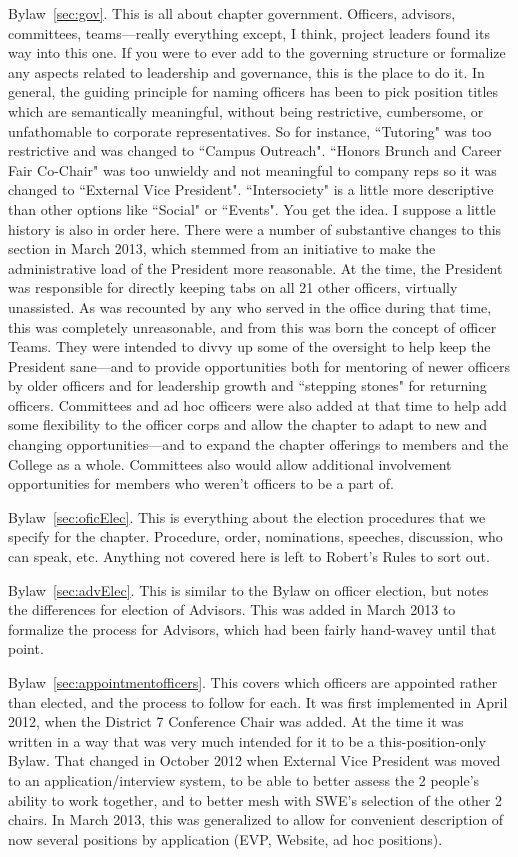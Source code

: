 \begin{preface}
Bylaw~\ref{sec:gov}. This is all about chapter government. Officers, advisors, committees, teams---really everything except, I think, project leaders found its way into this one. If you were to ever add to the governing structure or formalize any aspects related to leadership and governance, this is the place to do it. In general, the guiding principle for naming officers has been to pick position titles which are semantically meaningful, without being restrictive, cumbersome, or unfathomable to corporate representatives. So for instance, ``Tutoring" was too restrictive and was changed to ``Campus Outreach". ``Honors Brunch and Career Fair Co-Chair" was too unwieldy and not meaningful to company reps so it was changed to ``External Vice President".  ``Intersociety" is a little more descriptive than other options like ``Social" or ``Events". You get the idea. I suppose a little history is also in order here. There were a number of substantive changes to this section in March 2013, which stemmed from an initiative to make the administrative load of the President more reasonable. At the time, the President was responsible for directly keeping tabs on all 21 other officers, virtually unassisted. As was recounted by any who served in the office during that time, this was completely unreasonable, and from this was born the concept of officer Teams. They were intended to divvy up some of the oversight to help keep the President sane---and to provide opportunities both for mentoring of newer officers by older officers and for leadership growth and ``stepping stones" for returning officers. Committees and ad hoc officers  were also added at that time to help add some flexibility to the officer corps and allow the chapter to adapt to new and changing opportunities---and to expand the chapter offerings to members and the College as a whole. Committees also would allow additional involvement opportunities for members who weren't officers to be a part of.

Bylaw~\ref{sec:oficElec}. This is everything about the election procedures that we specify for the chapter. Procedure, order, nominations, speeches, discussion, who can speak, etc. Anything not covered here is left to Robert's Rules to sort out. 

Bylaw~\ref{sec:advElec}. This is similar to the Bylaw on officer election, but notes the differences for election of Advisors. This was added in March 2013 to formalize the process for Advisors, which had been fairly hand-wavey until that point.

Bylaw~\ref{sec:appointmentofficers}. This covers which officers are appointed rather than elected, and the process to follow for each. It was first implemented in April 2012, when the District 7 Conference Chair was added. At the time it was written in a way that was very much intended for it to be a this-position-only Bylaw. That changed in October 2012 when External Vice President was moved to an application/interview system, to be able to better assess the 2 people's ability to work together, and to better mesh with SWE's selection of the other 2 chairs. In March 2013, this  was generalized to allow for convenient description of now several positions by application (EVP, Website, ad hoc positions).


\end{preface}
